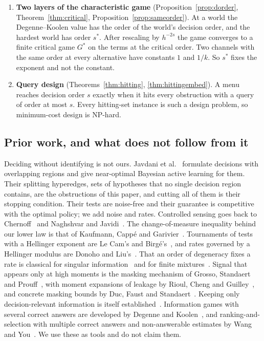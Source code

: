 \begin{enumerate}
degree-capped class breaks the uniform bound, and one parameter of nonlinearity moves the order
from $h^{6}$ to $h^{4}$.
\item[5)] \textbf{Two layers of the characteristic game} (Proposition~\ref{prop:dorder},
Theorem~\ref{thm:critical}, Proposition~\ref{prop:sameorder}). At a world the Degenne--Koolen
value has the order of the world's decision order, and the hardest world has order $s^*$. After
rescaling by $h^{-2s}$ the game converges to a finite critical game $G^*$ on the terms at the
critical order. Two channels with the same order at every alternative have constants $1$ and
$1/k$. So $s^*$ fixes the exponent and not the constant.
\item[6)] \textbf{Query design} (Theorems~\ref{thm:hitting}, \ref{thm:hittingembed}). A menu reaches
decision order $s$ exactly when it hits every obstruction with a query of order at most $s$.
Every hitting-set instance is such a design problem, so minimum-cost design is NP-hard.
\end{enumerate}

\subsection{Prior work, and what does not follow from it}

Deciding without identifying is not ours. Javdani et al.~\cite{javdani2014} formulate decisions
with overlapping regions and give near-optimal Bayesian active learning for them. Their
splitting hyperedges, sets of hypotheses that no single decision region contains, are the
obstructions of this paper, and cutting all of them is their stopping condition. Their tests are
noise-free and their guarantee is competitive with the optimal policy; we add noise and rates.
Controlled sensing goes back to Chernoff~\cite{chernoff1959} and Naghshvar and
Javidi~\cite{naghshvar2013}. The change-of-measure inequality behind our lower law is that of
Kaufmann, Capp\'e and Garivier~\cite{kaufmann2016}. Tournaments of tests with a Hellinger
exponent are Le Cam's and Birg\'e's~\cite{lecam1973,birge1983}, and rates governed by a Hellinger
modulus are Donoho and Liu's~\cite{donoho1991}. That an order of degeneracy fixes a rate is
classical for singular information~\cite{rotnitzky2000} and for finite
mixtures~\cite{heinrich2018,honguyen2015}. Signal that
appears only at high moments is the masking mechanism of Grosso, Standaert and
Prouff~\cite{grosso2014}, with moment expansions of leakage by Rioul, Cheng and
Guilley~\cite{rioul2021}, and concrete masking bounds by Duc, Faust and Standaert~\cite{duc2015}.
Keeping only decision-relevant information is itself established~\cite{poli2023}. Information
games with several correct answers are developed by Degenne and Koolen~\cite{degenne2019}, and
ranking-and-selection with multiple correct answers and non-answerable estimates by Wang and
You~\cite{wangyou2026}. We use these as tools and do not claim them.

